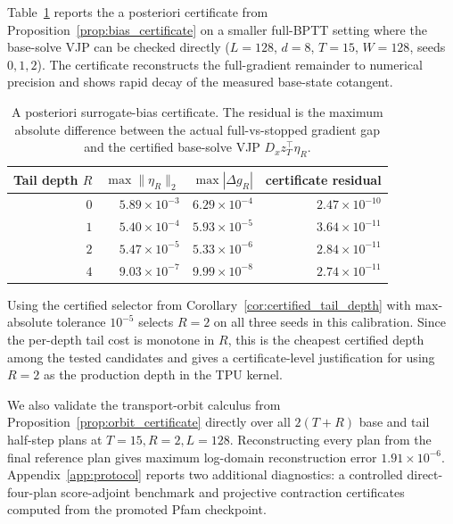 \documentclass{article}
\begin{document}
Table~\ref{tab:bias_certificate} reports the a posteriori certificate from Proposition~\ref{prop:bias_certificate} on a smaller full-BPTT setting where the base-solve VJP can be checked directly ($L=128$, $d=8$, $T=15$, $W=128$, seeds $0,1,2$). The certificate reconstructs the full-gradient remainder to numerical precision and shows rapid decay of the measured base-state cotangent.

\begin{table}[h]
    \centering
    \begin{tabular}{@{}rrrr@{}}
        \toprule
        Tail depth $R$ & $\max\|\eta_R\|_2$ & $\max|\Delta g_R|$ & certificate residual \\
        \midrule
        $0$ & $5.89\times 10^{-3}$ & $6.29\times 10^{-4}$ & $2.47\times 10^{-10}$ \\
        $1$ & $5.40\times 10^{-4}$ & $5.93\times 10^{-5}$ & $3.64\times 10^{-11}$ \\
        $2$ & $5.47\times 10^{-5}$ & $5.33\times 10^{-6}$ & $2.84\times 10^{-11}$ \\
        $4$ & $9.03\times 10^{-7}$ & $9.99\times 10^{-8}$ & $2.74\times 10^{-11}$ \\
        \bottomrule
    \end{tabular}
    \caption{A posteriori surrogate-bias certificate. The residual is the maximum absolute difference between the actual full-vs-stopped gradient gap and the certified base-solve VJP $D_x z_T^\top\eta_R$.}
    \label{tab:bias_certificate}
\end{table}

Using the certified selector from Corollary~\ref{cor:certified_tail_depth} with max-absolute tolerance $10^{-5}$ selects $R=2$ on all three seeds in this calibration. Since the per-depth tail cost is monotone in $R$, this is the cheapest certified depth among the tested candidates and gives a certificate-level justification for using $R=2$ as the production depth in the TPU kernel.

We also validate the transport-orbit calculus from Proposition~\ref{prop:orbit_certificate} directly over all $2(T+R)$ base and tail half-step plans at $T=15,R=2,L=128$. Reconstructing every plan from the final reference plan gives maximum log-domain reconstruction error $1.91\times 10^{-6}$. Appendix~\ref{app:protocol} reports two additional diagnostics: a controlled direct-four-plan score-adjoint benchmark and projective contraction certificates computed from the promoted Pfam checkpoint.
\end{document}
